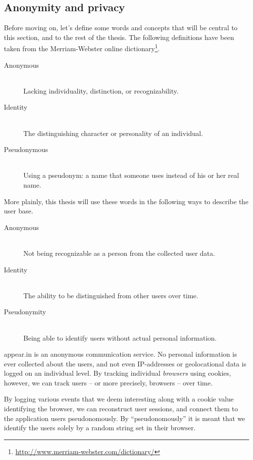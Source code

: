 \subsection{Anonymity and privacy}
\label{intro:sub:anonymity_privacy}

Before moving on, let's define some words and concepts that will be central to this section, and to the rest of the thesis. The following definitions have been taken from the Merriam-Webster online dictionary\footnote{\url{http://www.merriam-webster.com/dictionary/}}.

\begin{description}
  \item[Anonymous] \hfill \\
    Lacking individuality, distinction, or recognizability.
  \item[Identity] \hfill \\
    The distinguishing character or personality of an individual.
  \item[Pseudonymous] \hfill \\
    Using a pseudonym: a name that someone uses instead of his or her real name.
\end{description}

More plainly, this thesis will use these words in the following ways to describe the user base.

\begin{description}
  \item[Anonymous] \hfill \\
    Not being recognizable as a person from the collected user data.
  \item[Identity] \hfill \\
    The ability to be distinguished from other users over time.
  \item[Pseudonymity] \hfill \\
    Being able to identify users without actual personal information.
\end{description}

appear.in is an anonymous communication service. No personal information is ever collected about the users, and not even IP-addresses or geolocational data is logged on an individual level. By tracking individual \emph{browsers} using cookies, however, we can track users -- or more precisely, browsers -- over time.

By logging various events that we deem interesting along with a cookie value identifying the browser, we can reconstruct user sessions, and connect them to the application users pseudonomously. By ``pseudonomously'' it is meant that we identify the users solely by a random string set in their browser.

